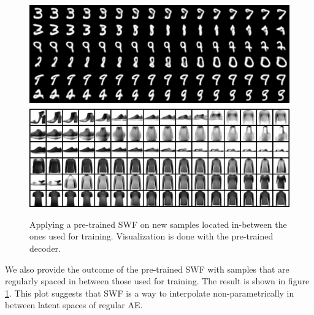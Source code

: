 \begin{figure}
\centering
\includegraphics[width=0.95\columnwidth]{figures/interpolations.png}
\label{fig:interpolation}
\caption{Applying a pre-trained SWF on new samples located in-between the ones used for training. Visualization is done with the pre-trained decoder.}
\end{figure}

We also provide the outcome of the pre-trained SWF with samples that are regularly spaced in between those used for training. The result is shown in figure \ref{fig:interpolation}. This plot suggests that SWF is a way to interpolate non-parametrically in between latent spaces of regular AE.
























